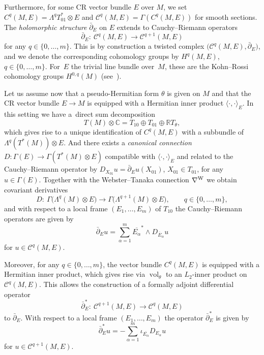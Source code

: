 \documentclass[pdftex]{sigma}
\numberwithin{equation}{section}
\newcommand{\RR}{\mathbb{R}}
\newcommand{\CC}{\mathbb{C}}
\begin{document}
Furthermore, for some CR vector bundle $E$ over $M$, we set $C^q(M,E)=\Lambda^qT_{01}^*\otimes E$ and
$\mathcal{C}^q(M,E)=\Gamma(C^q(M,E))$ for smooth sections. The {\em holomorphic structure} $\bar{\partial}_E$ on $E$ extends to Cauchy--Riemann operators
\[ \bar{\partial}_E\colon \ \mathcal{C}^q(M,E) \to \mathcal{C}^{q+1}(M,E)\]
for any $q\in\{0,\dots,m\}$. This is by construction a twisted complex $\big( \mathcal{C}^q(M,E), \bar{\partial}_E\big)$, and
we denote the corresponding cohomology groups by $H^q(M,E)$, $q\in\{0,\dots,m\}$.
For~$E$ the trivial line bundle over~$M$, these are the Kohn--Rossi cohomology groups $H^{0,q}(M)$ (see~\cite{Tan}).

Let us assume now that a pseudo-Hermitian form $\theta$ is given on $M$ and
that the CR vector bundle $E\to M$ is equipped with a Hermitian inner product
$\langle\cdot,\cdot\rangle_E$. In this setting we have a~direct sum decomposition
\[
T(M)\otimes\CC = T_{10}\oplus T_{01}\oplus \RR T_\theta,
\]
which gives rise to a unique identification of $C^q(M,E)$ with a subbundle of $\Lambda^q(T^*(M))\otimes E$.
And there exists
a {\em canonical connection} $D\colon \Gamma(E)\to\Gamma(T^*(M)\otimes E)$ compatible with $\langle\cdot,\cdot\rangle_E$
and related to the Cauchy--Riemann operator by $D_{X_{01}}u=\bar{\partial}_Eu(X_{01})$, $X_{01}\in T_{01}$,
for any $u\in\Gamma(E)$.
Together with the Webster--Tanaka connection $\nabla^{\rm W}$ we obtain covariant derivatives
\[
D\colon \ \Gamma\big(\Lambda^q(M)\otimes E\big) \to \Gamma\big(\Lambda^{q+1}(M)\otimes E\big),\qquad q\in\{0,\dots,m\},
\]
and  with respect to a local frame $(E_1,\dots,E_m)$ of $T_{10}$ the Cauchy--Riemann operators are given by
\[
\bar{\partial}_Eu = \sum_{\alpha=1}^m \overline{E_\alpha}^*\wedge D_{\overline{E}_\alpha}u
\]
for $u\in\mathcal{C}^q(M,E)$.

Moreover, for any $q\in\{0,\dots,m\}$, the vector bundle $C^q(M,E)$ is equipped with a Hermitian inner product,
which gives rise via $\operatorname{vol}_\theta$ to an $L_2$-inner product on $\mathcal{C}^q(M,E)$.
This allows the construction of a formally adjoint differential operator
\[
\bar{\partial}^*_E\colon \ \mathcal{C}^{q+1}(M,E) \to \mathcal{C}^{q}(M,E)
\]
to $\bar{\partial}_E$.
With respect to a local frame $(E_1,\dots,E_m)$ the operator $\bar{\partial}^*_E$ is given by
\[
\bar{\partial}^*_Eu = -\sum_{\alpha=1}^m \iota_{\overline{E_\alpha}} D_{E_\alpha}u
\]
for $u\in\mathcal{C}^{q+1}(M,E)$.
\end{document}
